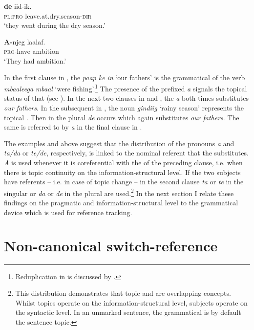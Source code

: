 \documentclass[output=paper
,newtxmath
,modfonts
,nonflat]{langsci/langscibook}
\begin{document}
\ex\label{ex:apel:17e}
\gll \textbf{de} iid-ik.  \\
     \textsc{pl:pro} leave.at.dry.season-\textsc{dir}\\
\glt ‘they went during the dry season.’
 

\ex\label{ex:apel:17f}
\gll \textbf{A-}njeg laalaf.\\
     \textsc{pro-}have ambition\\
\glt ‘They had ambition.’
\z
\z

In the first clause in , the  \textit{paap ke in} ‘our fathers’ is the grammatical  of the verb \textit{mbaaleega} \textit{mbaal} ‘were fishing’.\footnote{Reduplication in  is discussed by \citet{Heath2014}.} The presence of the prefixed  \textit{a} signals the topical status of that  (see ). In the next two clauses in  and , the  \textit{a} both times substitutes \textit{our fathers}. In the subsequent  in , the noun \textit{gindiig} ‘rainy season’ represents the topical . Then in  the plural  \textit{de} occurs which again substitutes \textit{our fathers}. The same  is referred to by \textit{a} in the final clause in .

The examples  and  above suggest that the distribution of the  pronouns \textit{a} and \textit{ta/da} or \textit{te/de}, respectively, is linked to the nominal referent that the  substitutes. \textit{A} is used whenever it is coreferential with the  of the preceding clause, i.e. when there is topic continuity on the information-structural level. If the two subjects have  referents -- i.e. in case of topic change -- in the second clause \textit{ta} or \textit{te} in the singular or \textit{da} or \textit{de} in the plural are used.\footnote{This distribution demonstrates that topic and  are overlapping concepts. Whilst topics operate on the information-structural level, subjects operate on the syntactic level. In an unmarked sentence, the grammatical  is by default the sentence topic.} In the next section I relate these findings on the pragmatic and information-structural level to the grammatical device  which is used for reference tracking.

\section{Non-canonical switch-reference}\label{sec:apel:3}
\end{document}
